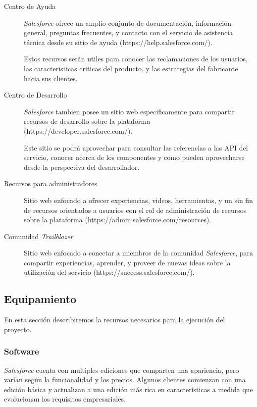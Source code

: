 \begin{description}
\item [Centro de Ayuda] \emph{Salesforce} ofrece un amplio conjunto de
documentación, información general, preguntas frecuentes, y contacto con el
servicio de asistencia técnica desde su sitio de ayuda
(https://help.salesforce.com/).

Estos recursos serán utiles para conocer las reclamaciones de los usuarios, las
caracteristicas criticas del producto, y las estrategias del fabricante hacia
sus clientes.

\item [Centro de Desarrollo] \emph{Salesforce} tambien posee un sitio web
especificamente para compartir recursos de desarrollo sobre la plataforma
(https://developer.salesforce.com/).

Este sitio se podrá aprovechar para consultar las referencias a las API del
servicio, conocer acerca de los componentes y como pueden aprovecharse desde la
perspectiva del desarrollador.

\item [Recursos para administradores] Sitio web enfocado a ofrecer experiencias,
videos, herramientas, y un sin fin de recursos orientados a usuarios con el rol
de administración de recursos sobre la plataforma
(https://admin.salesforce.com/resources).

\item [Comunidad \emph{Trailblazer}] Sitio web enfocado a conectar a miembros de
la comunidad \emph{Salesforce}, para compartir experiencias, aprender, y proveer
de nuevas ideas sobre la utilización del servicio
(https://success.salesforce.com/).

\end{description}

\subsection{Equipamiento}
En esta sección describiremos la recursos necesarios para la ejecución del
proyecto.

\subsubsection{Software}
\emph{Salesforce} cuenta con multiples ediciones que comparten una apariencia,
pero varían según la funcionalidad y los precios. Algunos clientes comienzan con
una edición básica y actualizan a una edición más rica en características a
medida que evolucionan los requisitos empresariales.

